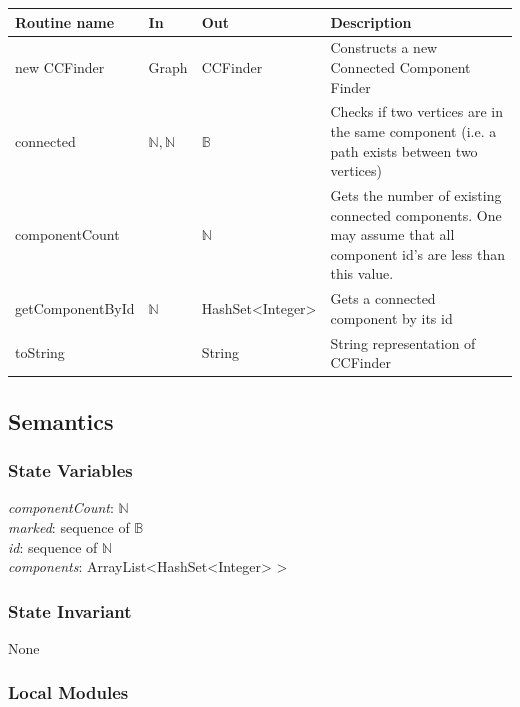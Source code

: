 \documentclass[12pt]{article}
\begin{document}
                
                \begin{tabular}{| l | l | l | p{5cm} |}
                \hline
                \textbf{Routine name} & \textbf{In} & \textbf{Out} & \textbf{Description}\\
                \hline
                new CCFinder & Graph & CCFinder & Constructs a new Connected Component Finder\\
                \hline
                connected&$\mathbb{N}, \mathbb{N}$& $\mathbb{B}$ & Checks if two vertices are in the same component (i.e. a path exists between two vertices)\\
                \hline
                componentCount & ~ & $\mathbb{N}$ & Gets the number of existing connected components. One may assume that all component id's are less than this value.\\
                \hline
                getComponentById &$\mathbb{N}$ &HashSet<Integer>&Gets a connected component by its id\\
                \hline 
                toString&~&String&String representation of CCFinder\\
                \hline
                \end{tabular}
                
                \subsection* {Semantics}
                    \subsubsection* {State Variables}
                    
                    \textit{componentCount}: $\mathbb{N}$\\
                    \textit{marked}: sequence of $\mathbb{B}$\\
                    \textit{id}: sequence of $\mathbb{N}$\\
                    \textit{components}: ArrayList<HashSet<Integer> >\\
                        
                    \subsubsection* {State Invariant} None
                
                \subsubsection*{Local Modules}
                
\end{document}
